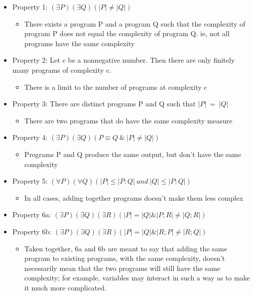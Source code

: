 \documentclass[]{article}
\begin{document}
\begin{itemize}
	\item Property 1: $(\exists P)(\exists Q)(|P|\neq |Q|)$
	\begin{itemize}
		\item There exists a program P and a program Q such that the complexity of program P does not equal the complexity of program Q. ie, not all programs have the same complexity
	\end{itemize}
	\item Property 2: Let c be a nonnegative number. Then there
are only finitely many programs of complexity c.
	\begin{itemize}
		\item There is a limit to the number of programs at complexity c
	\end{itemize}
	\item Property 3: There are distinct programs P and Q such
that $|P| ~= ~|Q|$
	\begin{itemize}
		\item There are two programs that do have the same complexity measure
	\end{itemize}
	\item Property 4: $(\exists P)(\exists Q)(P \equiv Q ~\& ~|P| \neq |Q|)$
	\begin{itemize}
		\item Programs P and Q produce the same output, but don't have the same complexity
	\end{itemize}
	\item Property 5: $(\forall P)(\forall Q)(|P| \leq |P; Q| ~and ~|Q| \leq |P; Q|)$
	\begin{itemize}
		\item In all cases, adding together programs doesn't make them less complex
	\end{itemize}
	\item Property 6a: $(\exists P)(\exists Q)(\exists R)(|P| = |Q| \& |P;R| \neq |Q; R|)$
	\item Property 6b: $(\exists P)(\exists Q)(\exists R)(|P| = |Q| \& |R;P| \neq |R; Q|)$
	\begin{itemize}
		\item Taken together, 6a and 6b are meant to say that adding the same program to existing programs, with the same complexity, doesn't necessarily mean that the two programs will still have the same complexity; for example, variables may interact in such a way as to make it much more complicated.
	\end{itemize}

\end{itemize}
\end{document}
